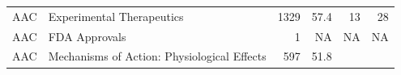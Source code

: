 \documentclass[11pt,]{article}
\begin{document}
\begin{longtable}[]{@{}llrrrr@{}}
\begin{minipage}[t]{0.06\columnwidth}
AAC\strut
\end{minipage} & \begin{minipage}[t]{0.43\columnwidth}\raggedright\strut
Experimental Therapeutics\strut
\end{minipage} & \begin{minipage}[t]{0.04\columnwidth}\raggedleft\strut
1329\strut
\end{minipage} & \begin{minipage}[t]{0.08\columnwidth}\raggedleft\strut
57.4\strut
\end{minipage} & \begin{minipage}[t]{0.11\columnwidth}\raggedleft\strut
13\strut
\end{minipage} & \begin{minipage}[t]{0.11\columnwidth}\raggedleft\strut
28\strut
\end{minipage}\tabularnewline
\begin{minipage}[t]{0.06\columnwidth}\raggedright\strut
AAC\strut
\end{minipage} & \begin{minipage}[t]{0.43\columnwidth}\raggedright\strut
FDA Approvals\strut
\end{minipage} & \begin{minipage}[t]{0.04\columnwidth}\raggedleft\strut
1\strut
\end{minipage} & \begin{minipage}[t]{0.08\columnwidth}\raggedleft\strut
NA\strut
\end{minipage} & \begin{minipage}[t]{0.11\columnwidth}\raggedleft\strut
NA\strut
\end{minipage} & \begin{minipage}[t]{0.11\columnwidth}\raggedleft\strut
NA\strut
\end{minipage}\tabularnewline
\begin{minipage}[t]{0.06\columnwidth}\raggedright\strut
AAC\strut
\end{minipage} & \begin{minipage}[t]{0.43\columnwidth}\raggedright\strut
Mechanisms of Action: Physiological Effects\strut
\end{minipage} & \begin{minipage}[t]{0.04\columnwidth}\raggedleft\strut
597\strut
\end{minipage} & \begin{minipage}[t]{0.08\columnwidth}\raggedleft\strut
51.8\strut
\end{minipage} & \begin{minipage}[t]{0.11\columnwidth}\raggedleft\strut

\end{minipage}
\end{longtable}
\end{document}
